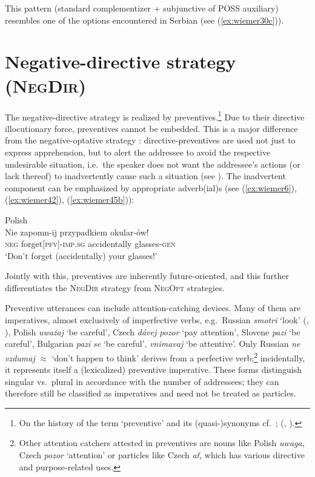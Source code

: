 \documentclass[output=paper,colorlinks,citecolor=brown]{langscibook}
\begin{document}
\noindent This pattern (standard complementizer + subjunctive of POSS auxiliary) resembles one of the options encountered in Serbian (see (\ref{ex:wiemer30c})).










\section{Negative-directive strategy (\textsc{NegDir})}
\label{sec:negdir}

The negative-directive strategy is realized by preventives.\footnote{On the history of the term `preventive' and its (quasi-)synonyms cf.\ \citet[29--30]{Ivić1958}; \citeauthor{Birjulin1992} (\citeyear[2]{Birjulin1992}, \citeyear[99--100]{Birjulin1994}).} Due to their directive illocutionary force, preventives cannot be embedded. This is a major difference from the negative-optative strategy \citep[41]{Dobrushina2006wiemer}: directive-preventives are used not just to express apprehension, but to alert the addressee to avoid the respective undesirable situation, i.e.\ the speaker does not want the addressee's actions (or lack thereof) to inadvertently cause such a situation (see ). The inadvertent component can be emphasized by appropriate adverb(ial)s (see (\ref{ex:wiemer6}), (\ref{ex:wiemer42}), (\ref{ex:wiemer45b})):



\ea \textnormal{Polish} \\
\label{ex:wiemer42} 
\gll Nie zapomn-ij {\op}przypadkiem{\cp} okular-ów! \\
\textsc{neg} forget\textsc{[pfv]-imp.sg} accidentally glasses-\textsc{gen} \\
\glt `Don't forget (accidentally) your glasses!'
\z


\noindent Jointly with this, preventives are inherently future-oriented, and this further differentiates the \textsc{NegDir} strategy from \textsc{NegOpt} strategies.

Preventive utterances can include attention-catching devices. Many of them are imperatives, almost exclusively of imperfective verbs, e.g.\ Russian \textit{smotri} `look' (\citealt[153--154]{Volodin1986}, \citealt[215--216]{Xrakovskij1990}), Polish \textit{uważaj} `be careful', Czech \textit{dávej pozor} `pay attention', Slovene \textit{pazi} `be careful', Bulgarian \textit{pazi} \textit{se} `be careful', \textit{vnimavaj} `be attentive'. Only Russian \textit{ne} \textit{vzdumaj} ${\approx}$ `don't happen to think' derives from a perfective verb;\footnote{Other attention catchers attested in preventives are nouns like Polish \textit{uwaga}, Czech \textit{pozor} `attention' or particles like Czech \textit{ať}, which has various directive and purpose-related uses.} incidentally, it represents itself a (lexicalized) preventive imperative. These forms distinguish singular vs.\ plural in accordance with the number of addressees; they can therefore still be classified as imperatives and need not be treated as particles.
\end{document}
